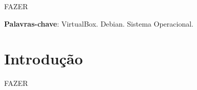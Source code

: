 \documentclass[
	12pt,				%
	oneside,   	        %
	a4paper,			%
	english,			%
	french,				%
	spanish,			%
	brazil,				%
	]{pacotes/abntex2}
\begin{document}
\frenchspacing 



\imprimirfolhaderosto



\begin{resumo}
FAZER

 \vspace{\onelineskip}
    
 \noindent
 \textbf{Palavras-chave}: VirtualBox. Debian. Sistema Operacional.
\end{resumo}




\tableofcontents*
\cleardoublepage

\textual

\makeatletter
\renewcommand{\chapter}{\@gobbletwo}
\makeatother

\section{Introdução}
\label{sec:introducao}
FAZER
\end{document}
